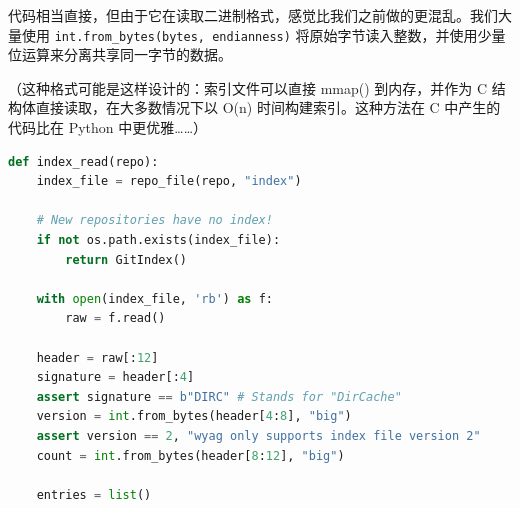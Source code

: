 \documentclass{ctexart}
\theoremstyle{remark}
\theoremstyle{warningstyle}
\theoremstyle{warningstyle}
\begin{document}
代码相当直接，但由于它在读取二进制格式，感觉比我们之前做的更混乱。我们大量使用 \lstinline|int.from_bytes(bytes, endianness)| 将原始字节读入整数，并使用少量位运算来分离共享同一字节的数据。

（这种格式可能是这样设计的：索引文件可以直接 mmap() 到内存，并作为 C 结构体直接读取，在大多数情况下以 O(n) 时间构建索引。这种方法在 C 中产生的代码比在 Python 中更优雅……）
\begin{lstlisting}[language=Python]
def index_read(repo):
    index_file = repo_file(repo, "index")

    # New repositories have no index!
    if not os.path.exists(index_file):
        return GitIndex()

    with open(index_file, 'rb') as f:
        raw = f.read()

    header = raw[:12]
    signature = header[:4]
    assert signature == b"DIRC" # Stands for "DirCache"
    version = int.from_bytes(header[4:8], "big")
    assert version == 2, "wyag only supports index file version 2"
    count = int.from_bytes(header[8:12], "big")

    entries = list()


\end{lstlisting}
\end{document}

